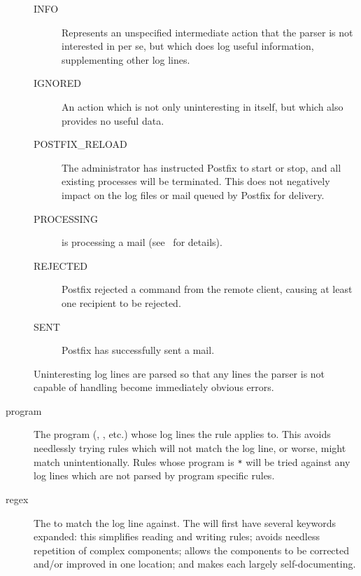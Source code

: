 \begin{description}
\begin{description}
            \item [INFO] Represents an unspecified intermediate action that
                the parser is not interested in per se, but which does log
                useful information, supplementing other log lines.

            \item [IGNORED] An action which is not only uninteresting in
                itself, but which also provides no useful data.

            \item [POSTFIX\_RELOAD] The administrator has instructed
                Postfix to start or stop, and all existing 
                processes will be terminated.  This does not negatively
                impact on the log files or mail queued by Postfix for
                delivery.

            \item [PROCESSING]  is processing a mail
                (see~\cite{postfix-cleanup} for details).

            \item [REJECTED] Postfix rejected a command from the remote
                client, causing at least one recipient to be rejected.

            \item [SENT] Postfix has successfully sent a mail.

        \end{description}

        Uninteresting log lines are parsed so that any lines the parser
        is not capable of handling become immediately obvious errors.

    \item [program] The program (, , etc.) whose
        log lines the rule applies to.  This avoids needlessly trying rules
        which will not match the log line, or worse, might match
        unintentionally.  Rules whose program is \texttt{*} will be tried
        against any log lines which are not parsed by program specific
        rules.

    \item [regex] The \regex{} to match the log line against.  The \regex{}
        will first have several keywords expanded: this simplifies reading
        and writing rules; avoids needless repetition of complex \regex{}
        components; allows the components to be corrected and/or improved
        in one location; and makes each \regex{} largely self-documenting.


\end{description}

